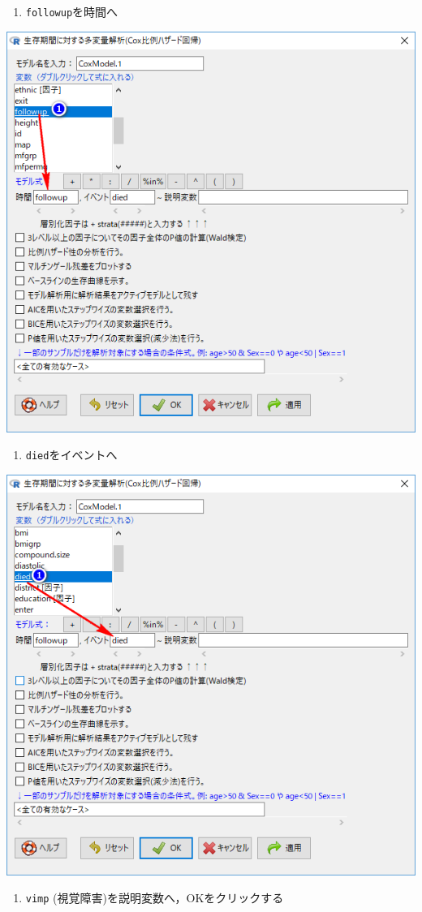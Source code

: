 \documentclass[11pt,]{problemset}
\providecommand{\tightlist}{%
  \setlength{\itemsep}{0pt}\setlength{\parskip}{0pt}}
\begin{document}
\begin{enumerate}
\def\labelenumi{\arabic{enumi}.}
\setcounter{enumi}{1}
\tightlist
\item
  \texttt{followup}を時間へ
\end{enumerate}

\begin{center}\includegraphics[width=0.6\linewidth,height=0.4\textheight]{pic/survival14} \end{center}

\begin{enumerate}
\def\labelenumi{\arabic{enumi}.}
\setcounter{enumi}{2}
\tightlist
\item
  \texttt{died}をイベントへ
\end{enumerate}

\begin{center}\includegraphics[width=0.6\linewidth,height=0.4\textheight]{pic/survival15} \end{center}
\newpage

\begin{enumerate}
\def\labelenumi{\arabic{enumi}.}
\setcounter{enumi}{3}
\tightlist
\item
  \texttt{vimp} (視覚障害)を説明変数へ，OKをクリックする
\end{enumerate}
\end{document}
